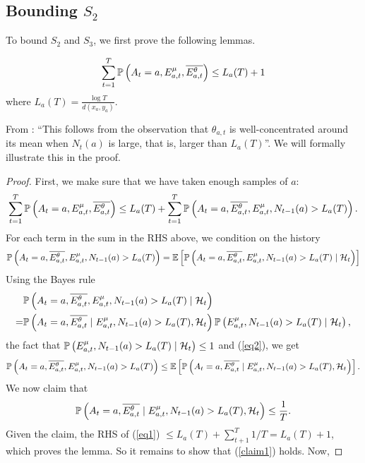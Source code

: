 \documentclass[11pt]{article}
\begin{document}
\subsection{Bounding $S_2$}
To bound $S_2$ and $S_3$, we first prove the following lemmas.
\begin{lemma}\label{B}
$$\sum_{t=1}^T  \mathbb{P}\left( A_t = a, E^{\mu}_{a,t}, \overline{E^{\theta}_{a,t}} \right)
\le L_a(T)+1$$
where $L_a(T) = \frac{\log T}{d(x_a,y_a)}$.
\end{lemma}
From \cite{agrawal2012analysis}: ``This follows from the observation that $\theta_{a,t}$ is well-concentrated around its mean when $N_t(a)$ is large, that is, larger than $L_a(T)$''. We will formally illustrate this in the proof.
\begin{proof} 
First, we make sure that we have taken enough samples of $a$:
\begin{equation}\label{eq1}\sum_{t=1}^T  \mathbb{P}\left( A_t = a, E^{\mu}_{a,t}, \overline{E^{\theta}_{a,t}} \right) 
    \le L_a(T) + \sum_{t=1}^T  \mathbb{P}\left( A_t = a,  \overline{E^{\theta}_{a,t}}, E^{\mu}_{a,t}, N_{t-1}(a) > L_a(T) \right).\end{equation}
    For each term in the sum in the RHS above, we condition on the history
    \begin{equation}\label{eq2}\mathbb{P}\left( A_t = a, \overline{E^{\theta}_{a,t}}, E^{\mu}_{a,t}, N_{t-1}(a) > L_a(T) \right) =  \mathbb{E}\left[ \mathbb{P}\left( A_t = a,  \overline{E^{\theta}_{a,t}}, E^{\mu}_{a,t}, N_{t-1}(a) > L_a(T)\mid \mathcal{H}_t \right) \right]
    \end{equation}
Using the Bayes rule
    \begin{align*}&\mathbb{P}\left( A_t = a,  \overline{E^{\theta}_{a,t}}, E^{\mu}_{a,t}, N_{t-1}(a) > L_a(T)\mid \mathcal{H}_t \right) \\= &\mathbb{P}\left( A_t = a, \overline{E^{\theta}_{a,t}}\mid E^{\mu}_{a,t}, N_{t-1}(a) > L_a(T), \mathcal{H}_t \right)\mathbb{P}\left( E^{\mu}_{a,t}, N_{t-1}(a) > L_a(T)\mid \mathcal{H}_t \right),\end{align*}
the fact that $\mathbb{P}\left( E^{\mu}_{a,t}, N_{t-1}(a) > L_a(T)\mid \mathcal{H}_t \right)\le 1$ and (\ref{eq2}), we get
    $$ \mathbb{P}\left( A_t = a, \overline{E^{\theta}_{a,t}}, E^{\mu}_{a,t}, N_{t-1}(a) > L_a(T) \right)
    \le \mathbb{E}\left[ \mathbb{P}\left( A_t = a, \overline{E^{\theta}_{a,t}}\mid E^{\mu}_{a,t}, N_{t-1}(a) > L_a(T), \mathcal{H}_t \right) \right].$$
We now claim that 
\begin{equation}\label{claim1}\mathbb{P}\left( A_t = a, \overline{E^{\theta}_{a,t}}\mid E^{\mu}_{a,t}, N_{t-1}(a) > L_a(T), \mathcal{H}_t \right) \le \frac{1}{T}.\end{equation}
Given the claim, the RHS of (\ref{eq1}) $\le L_a(T) + \sum_{t+1}^T 1/T = L_a(T) +1$, which proves the lemma. So it remains to show that (\ref{claim1}) holds. Now,

\end{proof}
\end{document}
